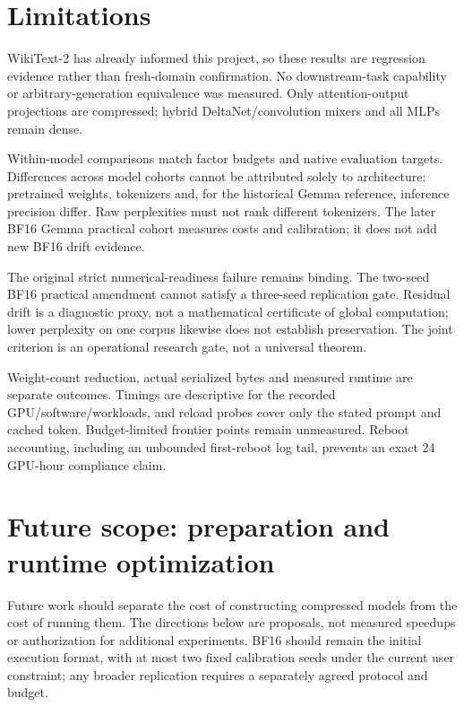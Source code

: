 \documentclass[10pt]{article}
\begin{document}
\section{Limitations}

WikiText-2 has already informed this project, so these results are regression evidence rather than fresh-domain confirmation. No downstream-task capability or arbitrary-generation equivalence was measured. Only attention-output projections are compressed; hybrid DeltaNet/convolution mixers and all MLPs remain dense.

Within-model comparisons match factor budgets and native evaluation targets. Differences across model cohorts cannot be attributed solely to architecture: pretrained weights, tokenizers and, for the historical Gemma reference, inference precision differ. Raw perplexities must not rank different tokenizers. The later BF16 Gemma practical cohort measures costs and calibration; it does not add new BF16 drift evidence.

The original strict numerical-readiness failure remains binding. The two-seed BF16 practical amendment cannot satisfy a three-seed replication gate. Residual drift is a diagnostic proxy, not a mathematical certificate of global computation; lower perplexity on one corpus likewise does not establish preservation. The joint criterion is an operational research gate, not a universal theorem.

Weight-count reduction, actual serialized bytes and measured runtime are separate outcomes. Timings are descriptive for the recorded GPU/software/workloads, and reload probes cover only the stated prompt and cached token. Budget-limited frontier points remain unmeasured. Reboot accounting, including an unbounded first-reboot log tail, prevents an exact 24 GPU-hour compliance claim.

\section{Future scope: preparation and runtime optimization}

Future work should separate the cost of constructing compressed models from the cost of running them. The directions below are proposals, not measured speedups or authorization for additional experiments. BF16 should remain the initial execution format, with at most two fixed calibration seeds under the current user constraint; any broader replication requires a separately agreed protocol and budget.
\end{document}
